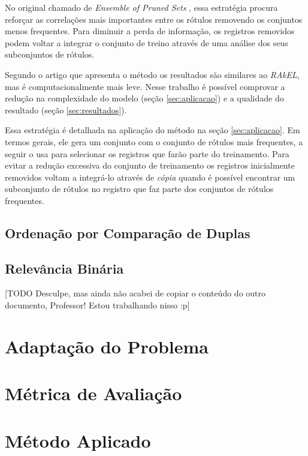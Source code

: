 \documentclass[runningheads,a4paper]{llncs}
\begin{document}
No original chamado de \textit{Ensemble of Pruned Sets} \cite{Read2008-bt}, essa estratégia procura reforçar as correlações mais importantes entre os rótulos removendo os conjuntos menos frequentes. Para diminuir a perda de informação, os registros removidos podem voltar a integrar o conjunto de treino através de uma análise dos seus subconjuntos de rótulos.

Segundo o artigo que apresenta o método os resultados são similares ao \textit{RAkEL}, mas é computacionalmente mais leve. Nesse trabalho é possível comprovar a redução na complexidade do modelo (seção \ref{sec:aplicacao}) e a qualidade do resultado (seção \ref{sec:resultados}).

Essa estratégia é detalhada na aplicação do método na seção \ref{sec:aplicacao}. Em termos gerais, ele gera um conjunto com o conjunto de rótulos mais frequentes, a seguir o usa para selecionar os registros que farão parte do treinamento. Para evitar a redução excessiva do conjunto de treinamento os registros inicialmente removidos voltam a integrá-lo através de \textit{cópia} quando é possível encontrar um subconjunto de rótulos no registro que faz parte dos conjuntos de rótulos frequentes.


\subsection{Ordenação por Comparação de Duplas} \label{subsec:comparacaoduplas}

\subsection{Relevância Binária} \label{subsec:relevanciabinaria}

[TODO Desculpe, mas ainda não acabei de copiar o conteúdo do outro documento, Professor! Estou trabalhando nisso :p]

\section{Adaptação do Problema}

\section{Métrica de Avaliação}

\section{Método Aplicado} \label{sec:justificativa}
\end{document}
